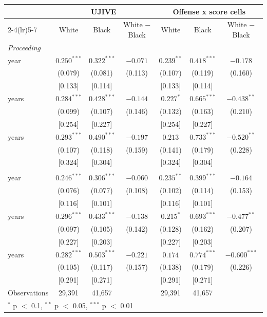 \begin{tabular}{lcccccc}
\toprule
 & \multicolumn{3}{c}{UJIVE} & \multicolumn{3}{c}{Offense x score cells} \\
\cmidrule(lr){2-4}\cmidrule(lr){5-7}
 & White & Black & White $-$ Black & White & Black & White $-$ Black \\
\midrule
\multicolumn{7}{l}{\textit{Proceeding}} \\
\quad 1 year & $0.250^{***}$ & $0.322^{***}$ & $-0.071$ & $0.239^{**}$ & $0.418^{***}$ & $-0.178$ \\
 & (0.079) & (0.081) & (0.113) & (0.107) & (0.119) & (0.160) \\
 & [0.133] & [0.114] &  & [0.133] & [0.114] &  \\
\quad 2 years & $0.284^{***}$ & $0.428^{***}$ & $-0.144$ & $0.227^{*}$ & $0.665^{***}$ & $-0.438^{**}$ \\
 & (0.099) & (0.107) & (0.146) & (0.132) & (0.163) & (0.210) \\
 & [0.254] & [0.227] &  & [0.254] & [0.227] &  \\
\quad 3 years & $0.293^{***}$ & $0.490^{***}$ & $-0.197$ & $0.213$ & $0.733^{***}$ & $-0.520^{**}$ \\
 & (0.107) & (0.118) & (0.159) & (0.141) & (0.179) & (0.228) \\
 & [0.324] & [0.304] &  & [0.324] & [0.304] &  \\
\addlinespace
\multicolumn{7}{l}{\textit{Revoked}} \\
\quad 1 year & $0.246^{***}$ & $0.306^{***}$ & $-0.060$ & $0.235^{**}$ & $0.399^{***}$ & $-0.164$ \\
 & (0.076) & (0.077) & (0.108) & (0.102) & (0.114) & (0.153) \\
 & [0.116] & [0.101] &  & [0.116] & [0.101] &  \\
\quad 2 years & $0.296^{***}$ & $0.433^{***}$ & $-0.138$ & $0.215^{*}$ & $0.693^{***}$ & $-0.477^{**}$ \\
 & (0.097) & (0.105) & (0.142) & (0.128) & (0.162) & (0.207) \\
 & [0.227] & [0.203] &  & [0.227] & [0.203] &  \\
\quad 3 years & $0.282^{***}$ & $0.503^{***}$ & $-0.221$ & $0.174$ & $0.774^{***}$ & $-0.600^{***}$ \\
 & (0.105) & (0.117) & (0.157) & (0.138) & (0.179) & (0.226) \\
 & [0.291] & [0.271] &  & [0.291] & [0.271] &  \\
\midrule
Observations & 29,391 & 41,657 &  & 29,391 & 41,657 &  \\
\bottomrule
\multicolumn{7}{l}{\footnotesize $^{*}$ p $<$ 0.1, $^{**}$ p $<$ 0.05, $^{***}$ p $<$ 0.01} \\
\end{tabular}
